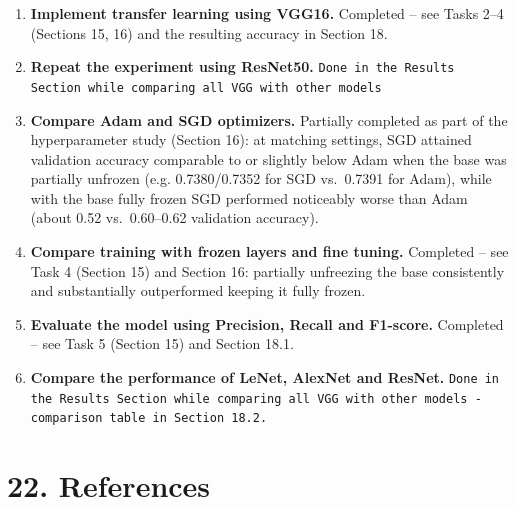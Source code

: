 \documentclass[11pt]{article}
\begin{document}
\begin{enumerate}

\item \textbf{Implement transfer learning using VGG16.} Completed --
see Tasks 2--4 (Sections 15, 16) and the resulting accuracy in Section 18.

\item \textbf{Repeat the experiment using ResNet50.} \texttt{Done in the Results Section while comparing all VGG with other models}

\item \textbf{Compare Adam and SGD optimizers.} Partially completed as
part of the hyperparameter study (Section 16): at matching settings, SGD
attained validation accuracy comparable to or slightly below Adam when
the base was partially unfrozen (e.g. 0.7380/0.7352 for SGD vs.\ 0.7391
for Adam), while with the base fully frozen SGD performed noticeably
worse than Adam (about 0.52 vs.\ 0.60--0.62 validation accuracy).

\item \textbf{Compare training with frozen layers and fine tuning.}
Completed -- see Task 4 (Section 15) and Section 16: partially unfreezing
the base consistently and substantially outperformed keeping it fully
frozen.

\item \textbf{Evaluate the model using Precision, Recall and F1-score.}
Completed -- see Task 5 (Section 15) and Section 18.1.

\item \textbf{Compare the performance of LeNet, AlexNet and ResNet.}
\texttt{Done in the Results Section while comparing all VGG with other models - comparison table in Section 18.2.}

\end{enumerate}


\section*{22. References}
\end{document}
